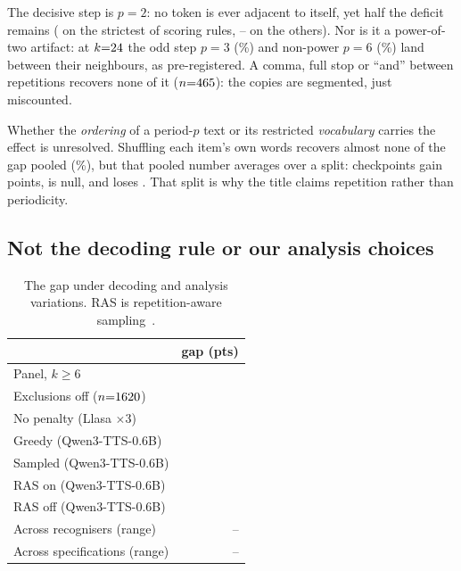 \documentclass{article}
\newcommand{\tabsize}{\small}
\begin{document}
The decisive step is $p{=}2$: no token is ever adjacent to itself, yet
half the deficit remains (\PerRatioScan{} on the strictest of
\PerNRules{} scoring rules, \PerRatioRecLo{}--\PerRatioRecHi{} on the
others). Nor is it a
power-of-two artifact: at $k{=}24{}$ the odd step $p{=}3$
(\OddPThree{}\%) and non-power $p{=}6$ (\OddPSix{}\%) land between
their neighbours, as pre-registered. A comma,
full stop or ``and'' between repetitions recovers none of it
($n{=}465{}$): the copies are segmented, just miscounted.

Whether the \emph{ordering} of a period-$p$ text or its restricted
\emph{vocabulary} carries the effect is unresolved. Shuffling each item's own words recovers almost none of the gap pooled
(\ShufRPct{}\%), but that pooled number averages over a split:
\ShufNUp{} checkpoints gain \ShufUpGain{} points, \ShufNNull{} is null,
and \ShufDownCk{} loses \ShufDownLoss{}. That split is why the title claims
repetition rather than periodicity.

\subsection{Not the decoding rule or our analysis choices}

\begin{table}[t]
\centering
\caption{The gap under decoding and analysis variations. RAS is
repetition-aware sampling~\cite{chen2024valle2}.}
\label{tab:vary}
{\tabsize\setlength{\tabcolsep}{3pt}
\begin{tabular}{lr}
\toprule
 & gap (pts) \\
\midrule
Panel, $k\ge6$                    & \ARPoolGap{} \\
Exclusions off ($n{=}1620{}$) & \ExSensAll{} \\
No penalty (Llasa $\times$3)      & \PenNoneGap{} \\
Greedy (Qwen3-TTS-0.6B)                   & \GreedyGap{} \\
Sampled (Qwen3-TTS-0.6B)                  & \GreedySampGap{} \\
RAS on (Qwen3-TTS-0.6B)                   & \RasOnGap{} \\
RAS off (Qwen3-TTS-0.6B)                  & \RasOffGap{} \\
Across \IndNJudges{} recognisers (range) & \IndGapLo{}--\IndGapHi{} \\
Across \SpecN{} specifications (range)  & \SpecLo{}--\SpecHi{} \\
\bottomrule
\end{tabular}}
\end{table}
\end{document}
